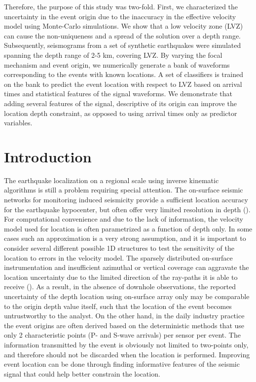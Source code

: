 \documentclass[letterpaper,11pt]{article}
\begin{document}
Therefore, the purpose of this study was two-fold. First, we characterized the uncertainty in the event origin due to the inaccuracy in the effective velocity model using Monte-Carlo simulations. We show that a low velocity zone (LVZ) can cause the non-uniqueness and a spread of the solution over a depth range. Subsequently, seismograms from a set of synthetic earthquakes were simulated spanning the depth range of 2-5 km, covering LVZ. By varying the focal mechanism and event origin, we numerically generate a bank of waveforms corresponding to the events with known locations. A set of classifiers is trained on the bank to predict the event location with respect to LVZ based on arrival times and statistical features of the signal waveforms. We demonstrate that adding several features of the signal, descriptive of its origin can improve the location depth constraint, as opposed to using arrival times only as predictor variables.
%
\section*{Introduction}
The earthquake localization on a regional scale using inverse kinematic algorithms is still a problem requiring special attention. The on-surface seismic networks for monitoring induced seismicity provide a sufficient location accuracy for the earthquake hypocenter, but often offer very limited resolution in depth (\cite{eisner_uncertainties_2009}). For computational convenience and due to the lack of information, the velocity model used for location is often parametrized as a function of depth only. In some cases such an approximation is a very strong assumption, and it is important to consider several different possible 1D structures to test the sensitivity of the location to errors in the velocity model. The sparsely distributed on-surface instrumentation and insufficient azimuthal or vertical coverage can aggravate the location uncertainty due to the limited direction of the ray-paths it is able to receive (\cite{eisner_comparison_2010}). As a result, in the absence of downhole observations, the reported uncertainty of the depth location using on-surface array only may be comparable to the origin depth value itself, such that the location of the event becomes untrustworthy to the analyst. On the other hand, in the daily industry practice the event origins are often derived based on the deterministic methods that use only 2 characteristic points (P- and S-wave arrivals) per sensor per event. The information transmitted by the event is obviously not limited to two-points only, and therefore should not be discarded when the location is performed. Improving event location can be done through finding informative features of the seismic signal that could help better constrain the location. 
\end{document}
